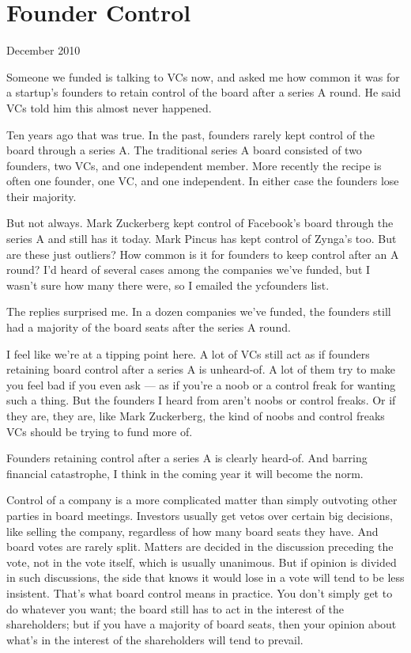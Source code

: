 \chapter{Founder Control}

December 2010

Someone we funded is talking to VCs now, and asked me how common it was
for a startup's founders to retain control of the board after a series A
round. He said VCs told him this almost never happened.

Ten years ago that was true. In the past, founders rarely kept control
of the board through a series A. The traditional series A board
consisted of two founders, two VCs, and one independent member. More
recently the recipe is often one founder, one VC, and one independent.
In either case the founders lose their majority.

But not always. Mark Zuckerberg kept control of Facebook's board through
the series A and still has it today. Mark Pincus has kept control of
Zynga's too. But are these just outliers? How common is it for founders
to keep control after an A round? I'd heard of several cases among the
companies we've funded, but I wasn't sure how many there were, so I
emailed the ycfounders list.

The replies surprised me. In a dozen companies we've funded, the
founders still had a majority of the board seats after the series A
round.

I feel like we're at a tipping point here. A lot of VCs still act as if
founders retaining board control after a series A is unheard-of. A lot
of them try to make you feel bad if you even ask --- as if you're a noob
or a control freak for wanting such a thing. But the founders I heard
from aren't noobs or control freaks. Or if they are, they are, like Mark
Zuckerberg, the kind of noobs and control freaks VCs should be trying to
fund more of.

Founders retaining control after a series A is clearly heard-of. And
barring financial catastrophe, I think in the coming year it will become
the norm.

Control of a company is a more complicated matter than simply outvoting
other parties in board meetings. Investors usually get vetos over
certain big decisions, like selling the company, regardless of how many
board seats they have. And board votes are rarely split. Matters are
decided in the discussion preceding the vote, not in the vote itself,
which is usually unanimous. But if opinion is divided in such
discussions, the side that knows it would lose in a vote will tend to be
less insistent. That's what board control means in practice. You don't
simply get to do whatever you want; the board still has to act in the
interest of the shareholders; but if you have a majority of board seats,
then your opinion about what's in the interest of the shareholders will
tend to prevail.


